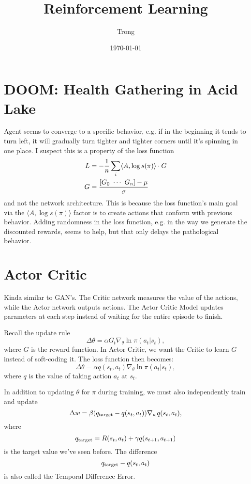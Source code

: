 \documentclass[12pt]{article}
\title{Reinforcement Learning}
\author{Trong}
\date{\today}
\theoremstyle{plain}
\theoremstyle{definition}
\theoremstyle{remark}
\renewcommand\frac[2]{\genfrac{}{}{0.5pt}{}{#1}{#2}}
\newcommand{\0}{\varnothing}
\renewcommand{\a}{\alpha}
\renewcommand{\b}{\beta}
\newcommand{\g}{\gamma}
\newcommand{\m}{\mu}
\newcommand{\s}{\sigma}
\renewcommand{\th}{\theta}
\newcommand{\D}{\Delta}
\newcommand{\<}{\langle}
\renewcommand{\>}{\rangle}
\begin{document}
\sloppy
\maketitle
\tableofcontents

\section{DOOM: Health Gathering in Acid Lake}

Agent seems to converge to a specific behavior, e.g. if in the beginning it tends to turn left, it will gradually turn tighter and tighter corners until it's spinning in one place. I suspect this is a property of the loss function
\begin{align*}
  L &= - \frac{1}{n} \sum_{i} \< A, \log s(\pi) \> \cdot G \\
  G &= \frac{[G_0 \ \cdots \ G_n] - \m}{\s}
\end{align*}
and not the network architecture. This is because the loss function's main goal via the \( \< A, \log s(\pi) \> \) factor is to create actions that conform with previous behavior. Adding randomness in the loss function, e.g. in the way we generate the discounted rewards, seems to help, but that only delays the pathological behavior.

\section{Actor Critic}

Kinda similar to GAN's. The Critic network measures the value of the actions, while the Actor network outputs actions. The Actor Critic Model updates parameters at each step instead of waiting for the entire episode to finish.

Recall the update rule
\[
\D \th = \a G_t \nabla_{\th} \ln \pi(a_t|s_t),
\]
where $ G $ is the reward function. In Actor Critic, we want the Critic to learn $ G $ instead of soft-coding it. The loss function then becomes: \[
\D \th = \a q(s_t, a_t) \nabla_{\th} \ln \pi(a_t|s_t),
\]
where $ q $ is the value of taking action $ a_t $ at $ s_t. $

In addition to updating $ \th $ for $ \pi $ during training, we must also independently train and update \[
\D w = \b (q_{\rm target} - q(s_t, a_t)) \nabla_{w} q(s_t, a_t),
\]
where \[
q_{\rm target} = R(s_t, a_t) + \g q(s_{t+1}, a_{t+1})
\]
is the target value we've seen before. The difference \[
q_{\rm target} - q(s_t, a_t)
\]
is also called the Temporal Difference Error.
\end{document}
